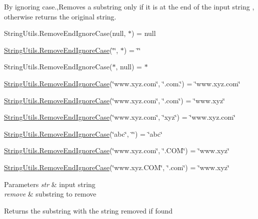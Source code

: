 By ignoring case.,Removes a substring only if it is at the end of the input string , otherwise returns the original string. 

String\+Utils.\+Remove\+End\+Ignore\+Case(null, $\ast$) = null 

\hyperlink{class_ultimate_1_1_utilities_1_1_string_utils_a27d7f65090c06d9c0376caab6e301ecf}{String\+Utils.\+Remove\+End\+Ignore\+Case}(\char`\"{}\char`\"{}, $\ast$) = \char`\"{}\char`\"{} 

String\+Utils.\+Remove\+End\+Ignore\+Case($\ast$, null) = $\ast$ 

\hyperlink{class_ultimate_1_1_utilities_1_1_string_utils_a27d7f65090c06d9c0376caab6e301ecf}{String\+Utils.\+Remove\+End\+Ignore\+Case}(\char`\"{}www.\+xyz.\+com\char`\"{}, \char`\"{}.\+com.\char`\"{}) = \char`\"{}www.\+xyz.\+com\char`\"{} 

\hyperlink{class_ultimate_1_1_utilities_1_1_string_utils_a27d7f65090c06d9c0376caab6e301ecf}{String\+Utils.\+Remove\+End\+Ignore\+Case}(\char`\"{}www.\+xyz.\+com\char`\"{}, \char`\"{}.\+com\char`\"{}) = \char`\"{}www.\+xyz\char`\"{} 

\hyperlink{class_ultimate_1_1_utilities_1_1_string_utils_a27d7f65090c06d9c0376caab6e301ecf}{String\+Utils.\+Remove\+End\+Ignore\+Case}(\char`\"{}www.\+xyz.\+com\char`\"{}, \char`\"{}xyz\char`\"{}) = \char`\"{}www.\+xyz.\+com\char`\"{} 

\hyperlink{class_ultimate_1_1_utilities_1_1_string_utils_a27d7f65090c06d9c0376caab6e301ecf}{String\+Utils.\+Remove\+End\+Ignore\+Case}(\char`\"{}abc\char`\"{}, \char`\"{}\char`\"{}) = \char`\"{}abc\char`\"{} 

\hyperlink{class_ultimate_1_1_utilities_1_1_string_utils_a27d7f65090c06d9c0376caab6e301ecf}{String\+Utils.\+Remove\+End\+Ignore\+Case}(\char`\"{}www.\+xyz.\+com\char`\"{}, \char`\"{}.\+C\+O\+M\char`\"{}) = \char`\"{}www.\+xyz\char`\"{} 

\hyperlink{class_ultimate_1_1_utilities_1_1_string_utils_a27d7f65090c06d9c0376caab6e301ecf}{String\+Utils.\+Remove\+End\+Ignore\+Case}(\char`\"{}www.\+xyz.\+C\+O\+M\char`\"{}, \char`\"{}.\+com\char`\"{}) = \char`\"{}www.\+xyz\char`\"{} 


\begin{DoxyParams}{Parameters}
{\em str} & input string\\
\hline
{\em remove} & substring to remove\\
\hline
\end{DoxyParams}
\begin{DoxyReturn}{Returns}
the substring with the string removed if found
\end{DoxyReturn}
